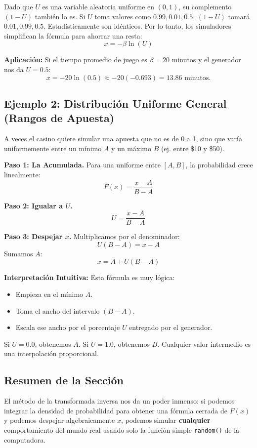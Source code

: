 \documentclass[11pt, letterpaper]{article}
\begin{document}
\begin{alertabox}
Dado que $U$ es una variable aleatoria uniforme en $(0,1)$, su complemento $(1-U)$ también lo es. Si $U$ toma valores como $0.99, 0.01, 0.5$, $(1-U)$ tomará $0.01, 0.99, 0.5$. Estadísticamente son idénticos.
Por lo tanto, los simuladores simplifican la fórmula para ahorrar una resta:
$$ x = -\beta \ln(U) $$
\end{alertabox}

\textbf{Aplicación:} Si el tiempo promedio de juego es $\beta = 20$ minutos y el generador nos da $U=0.5$:
$$ x = -20 \ln(0.5) \approx -20 (-0.693) = 13.86 \text{ minutos.} $$

\subsection{Ejemplo 2: Distribución Uniforme General (Rangos de Apuesta)}
A veces el casino quiere simular una apuesta que no es de 0 a 1, sino que varía uniformemente entre un mínimo $A$ y un máximo $B$ (ej. entre \$10 y \$50).

\textbf{Paso 1: La Acumulada.}
Para una uniforme entre $[A, B]$, la probabilidad crece linealmente:
$$ F(x) = \frac{x - A}{B - A} $$

\textbf{Paso 2: Igualar a $U$.}
$$ U = \frac{x - A}{B - A} $$

\textbf{Paso 3: Despejar $x$.}
Multiplicamos por el denominador:
$$ U(B - A) = x - A $$
Sumamos $A$:
$$ x = A + U(B - A) $$

\textbf{Interpretación Intuitiva:}
Esta fórmula es muy lógica:
\begin{itemize}
    \item Empieza en el mínimo $A$.
    \item Toma el ancho del intervalo $(B-A)$.
    \item Escala ese ancho por el porcentaje $U$ entregado por el generador.
\end{itemize}

Si $U=0.0$, obtenemos $A$. Si $U=1.0$, obtenemos $B$. Cualquier valor intermedio es una interpolación proporcional.

\subsection{Resumen de la Sección}
El método de la transformada inversa nos da un poder inmenso: si podemos integrar la densidad de probabilidad para obtener una fórmula cerrada de $F(x)$ y podemos despejar algebraicamente $x$, podemos simular \textbf{cualquier} comportamiento del mundo real usando solo la función simple \texttt{random()} de la computadora.
\end{document}
